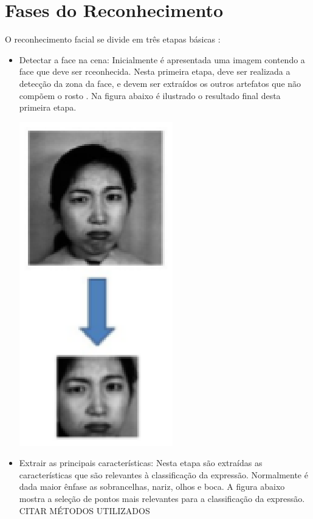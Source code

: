\section{Fases do Reconhecimento}
O reconhecimento facial se divide em três etapas básicas \cite{Elizabeth}:
\begin{itemize}
\item Detectar a face na cena: Inicialmente é apresentada uma imagem contendo a face que deve ser rceonhecida. Nesta primeira etapa, deve ser realizada a detecção da zona da face, e devem ser extraídos os outros artefatos que não compõem o rosto \cite{FernandoGil}.
Na figura abaixo é ilustrado o resultado final desta primeira etapa.
\begin{center}
	\includegraphics[scale=0.5]{graficos/rosto}
	\cite{Elizabeth}
\end{center}
\item Extrair as principais características: Nesta etapa são extraídas as características que são relevantes à classificação da expressão. Normalmente é dada maior ênfase as sobrancelhas, nariz, olhos e boca.
A figura abaixo mostra a seleção de pontos mais relevantes para a classificação da expressão. CITAR MÉTODOS UTILIZADOS
\begin{center}

\end{center}
\end{itemize}
